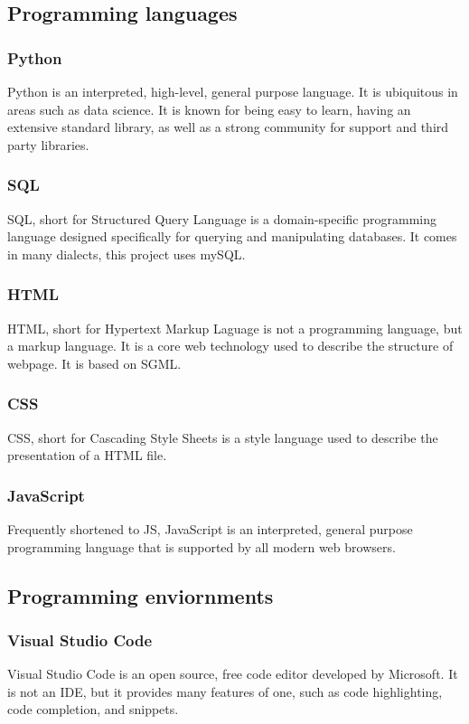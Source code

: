    \subsection{Programming languages}
        \subsubsection{Python}
        Python is an interpreted, high-level, general purpose language. It is ubiquitous in areas such as data science. It is known for being easy to learn, having an extensive standard library, as well as a strong community for support and third party libraries.
        \subsubsection{SQL}
        SQL, short for Structured Query Language is a domain-specific programming language designed specifically for querying and manipulating databases. It comes in many dialects, this project uses mySQL.
        \subsubsection{HTML} 
        HTML, short for Hypertext Markup Laguage is not a programming language, but a markup language. It is a core web technology used to describe the structure of webpage. It is based on SGML.
        \subsubsection{CSS}
        CSS, short for Cascading Style Sheets is a style language used to describe the presentation of a HTML file.
        \subsubsection{JavaScript}
        Frequently shortened to JS, JavaScript is an interpreted, general purpose programming language that is supported by all modern web browsers.
    \subsection{Programming enviornments}
        \subsubsection{Visual Studio Code}
        Visual Studio Code is an open source, free code editor developed by Microsoft. It is not an IDE, but it provides many features of one, such as code highlighting, code completion, and snippets.
